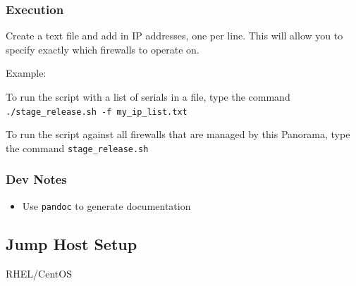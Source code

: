 \hypertarget{execution}{%
\subsubsection{Execution}\label{execution}}

Create a text file and add in IP addresses, one per line. This will
allow you to specify exactly which firewalls to operate on.

Example:

\begin{Shaded}
\begin{Highlighting}[]
\end{Highlighting}
\end{Shaded}

To run the script with a list of serials in a file, type the command
\texttt{./stage\_release.sh\ -f\ my\_ip\_list.txt}

To run the script against all firewalls that are managed by this
Panorama, type the command \texttt{stage\_release.sh}

\hypertarget{dev-notes}{%
\subsubsection{Dev Notes}\label{dev-notes}}

\begin{itemize}
\tightlist
\item
  Use \texttt{pandoc} to generate documentation
\end{itemize}

\begin{Shaded}
\begin{Highlighting}[]
\KeywordTok{\&\&} 
\end{Highlighting}
\end{Shaded}

\hypertarget{jump-host-setup}{%
\subsection{Jump Host Setup}\label{jump-host-setup}}

RHEL/CentOS

\begin{Shaded}
\begin{Highlighting}[]
\end{Highlighting}
\end{Shaded}

